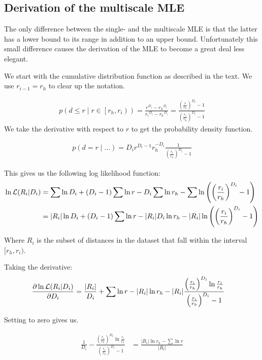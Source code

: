 \documentclass[11pt]{article}
\begin{document}
\subsection{Derivation of the multiscale MLE}

The only difference between the single- and the multiscale MLE is that the latter has a lower bound to its range in addition to an upper bound. Unfortunately this small difference causes the derivation of the MLE to become a great deal less elegant.

We start with the cumulative distribution function as described in the text. We use $r_{i-1} = r_h$ to clear up the notation.

\begin{align*}
p\left(d \leq r \mid r \in \left[r_h, r_i\right)\right) = \frac{r^{D_i} - {r_h}^{D_i}}{{r_i}^{D_i} - {r_{h}}^{D_i}} = \frac{\left(\frac{r}{r_h}\right)^{D_i} - 1}{\left(\frac{r_i}{r_h}\right)^{D_i} - 1}
\end{align*}
We take the derivative with respect to $r$ to get the probability density function.

\begin{align*}
p(d = r \mid \ldots) = {D_i} r^{D_i - 1} r_h^{-D_i} \frac{1}{\left(\frac{r_i}{r_h}\right)^{D_i} - 1}
\end{align*}

This gives us the following log likelihood function:
\begin{align*}
\ln{\cal L}(R_i|D_i) &= \sum \ln D_i +  (D_i-1) \sum \ln r - D_i \sum \ln r_h  - \sum \ln \left(\left(\frac{r_i}{r_h}\right)^{D_i} -1\right)\\
&=  |R_i|\ln D_i + (D_i - 1)\sum \ln r - |R_i| D_i \ln r_h - |R_i| \ln \left(\left(\frac{r_i}{r_h}\right)^{D_i} -1\right) 
\end{align*}

Where $R_i$ is the subset of distances in the dataset that fall within the interval $[r_h, r_i)$. 

Taking the derivative:
\begin{align*}
\frac {\partial \ln{\cal L}(R_i|D_i)}{\partial D_i} &=  \frac{|R_i|}{D_i} + \sum \ln r - |R_i|\ln r_h - |R_i| \frac{\left(\frac{r_i}{r_h}\right)^{D_i} \ln \frac{r_i}{r_h}}{\left(\frac{r_i}{r_h}\right)^{D_i} -1}
\end{align*}

Setting to zero gives us.

\begin{align*}
\frac{1}{D_i}  - \frac{\left(\frac{r_i}{r_h}\right)^{D_i} \ln \frac{r_i}{r_h}}{\left(\frac{r_i}{r_h}\right)^{D_i} -1} &= \frac{|R_i| \ln r_h - \sum \ln r}{|R_i|}  
\end{align*}
\end{document}
